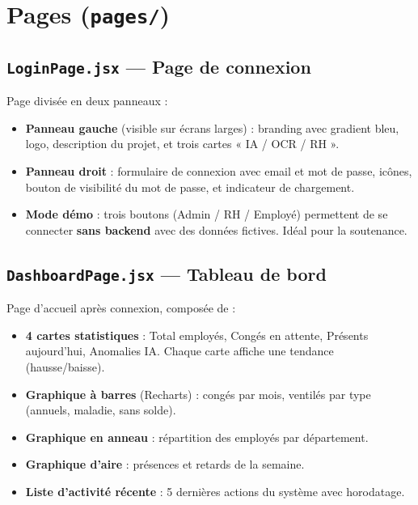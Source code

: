 \documentclass[a4paper,12pt]{report}
\begin{document}
\section{Pages (\texttt{pages/})}

\subsection{\texttt{LoginPage.jsx} --- Page de connexion}
Page divisée en deux panneaux :
\begin{itemize}
  \item \textbf{Panneau gauche} (visible sur écrans larges) : branding avec gradient bleu, logo, description du projet, et trois cartes « IA / OCR / RH ».
  \item \textbf{Panneau droit} : formulaire de connexion avec email et mot de passe, icônes, bouton de visibilité du mot de passe, et indicateur de chargement.
  \item \textbf{Mode démo} : trois boutons (Admin / RH / Employé) permettent de se connecter \textbf{sans backend} avec des données fictives. Idéal pour la soutenance.
\end{itemize}

\subsection{\texttt{DashboardPage.jsx} --- Tableau de bord}
Page d'accueil après connexion, composée de :
\begin{itemize}
  \item \textbf{4 cartes statistiques} : Total employés, Congés en attente, Présents aujourd'hui, Anomalies IA. Chaque carte affiche une tendance (hausse/baisse).
  \item \textbf{Graphique à barres} (Recharts) : congés par mois, ventilés par type (annuels, maladie, sans solde).
  \item \textbf{Graphique en anneau} : répartition des employés par département.
  \item \textbf{Graphique d'aire} : présences et retards de la semaine.
  \item \textbf{Liste d'activité récente} : 5 dernières actions du système avec horodatage.
\end{itemize}
\end{document}
